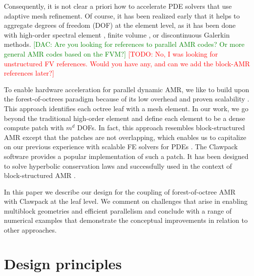 \documentclass{IOS-Book-Article}     %
\newcommand{\comment}[1]{\textcolor{green}{[DAC: #1]}\xspace}
\newcommand{\todo}[1]{\textcolor{red}{[TODO: #1]}\xspace}
\begin{document}
Consequently, it is not clear a priori how to accelerate PDE solvers
that use adaptive mesh refinement.
Of course, it has been realized early
that it helps to aggregate degrees of freedom (DOF) at the element
level, as it has been done with high-order spectral element
\cite{TufoFischer99}, finite volume
\cite{paramesh, chombo, samrai}, or discontinuous Galerkin
\cite{BursteddeGhattasGurnisEtAl10} methods.
\comment{Are you looking for references to parallel AMR codes?  Or more general AMR codes based on the FVM?}
\todo{No, I was looking for unstructured FV references.  Would you have any,
and can we add the block-AMR references later?}


To enable hardware acceleration for parallel dynamic AMR, we like to
build upon the forest-of-octrees paradigm because of its low overhead
and proven scalability \cite{BursteddeWilcoxGhattas11}.  This approach
identifies each octree leaf with a mesh element.  In our work, we go
beyond the traditional high-order element and define each element to
be a dense compute patch with $m^d$ DOFs.  In fact, this approach
resembles block-structured AMR \cite{be-ol:1984, be-co:1989, be-le:1991,
ColellaGravesKeenEtAl07,
BerzinsLuitjensMengEtAl10} except that the
patches are not overlapping, which enables us to capitalize on our
previous experience with scalable FE solvers for PDEs
\cite{BursteddeStadlerAlisicEtAl13}.  The Clawpack software
\cite{LeVeque97} provides a popular implementation of such a patch.
It has been designed to solve hyperbolic conservation laws
and successfully used in the context of block-structured AMR
\cite{be-le:1991, amrclaw}.

In this paper we describe our design for the coupling of forest-of-octree AMR
with Clawpack at the leaf level.  We comment on challenges that arise in
enabling multiblock geometries and efficient parallelism and conclude with a range
of numerical examples that demonstrate the conceptual improvements in relation
to other approaches.

\section{Design principles}
\end{document}
